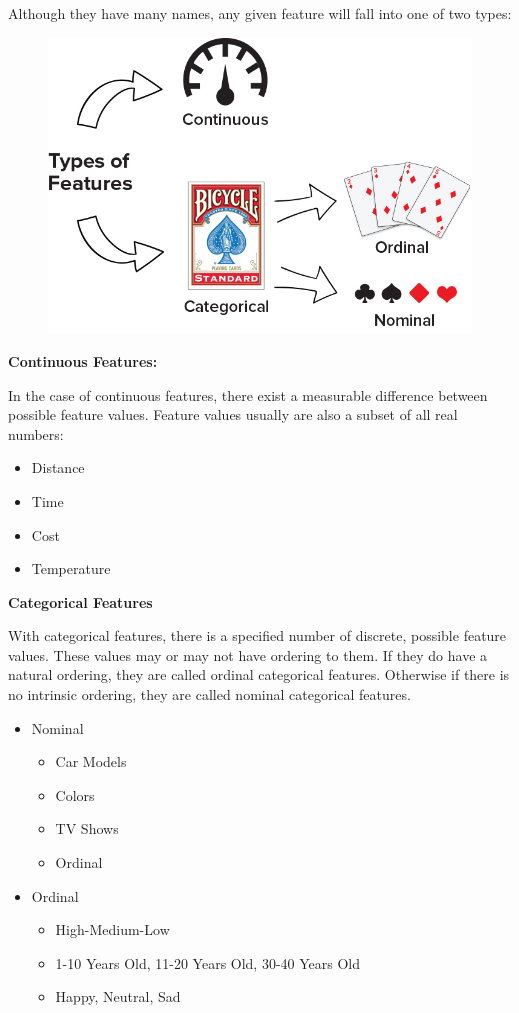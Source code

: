 \documentclass{article}
\begin{document}
Although they have many names, any given feature will fall into one of two types:
\begin{figure}[H]
\centering
\includegraphics[width=0.8\linewidth]{pic/features-premiere-3.png}
\end{figure}

{\bf{Continuous Features:}}

\par In the case of continuous features, there exist a measurable difference between possible feature values. Feature values usually are also a subset of all real numbers:

\begin{itemize}
	\item Distance
	\item Time
	\item Cost
	\item Temperature
\end{itemize}

{\bf{Categorical Features}}

With categorical features, there is a specified number of discrete, possible feature values. These values may or may not have ordering to them. If they do have a natural ordering, they are called ordinal categorical features. Otherwise if there is no intrinsic ordering, they are called nominal categorical features.

\begin{itemize}
	\item Nominal
		\begin{itemize}
			\item Car Models
			\item Colors
			\item TV Shows
			\item Ordinal
		\end{itemize}
	\item Ordinal		
		\begin{itemize}
			\item High-Medium-Low
			\item 1-10 Years Old, 11-20 Years Old, 30-40 Years Old
			\item Happy, Neutral, Sad
		\end{itemize}
\end{itemize}
\end{document}
